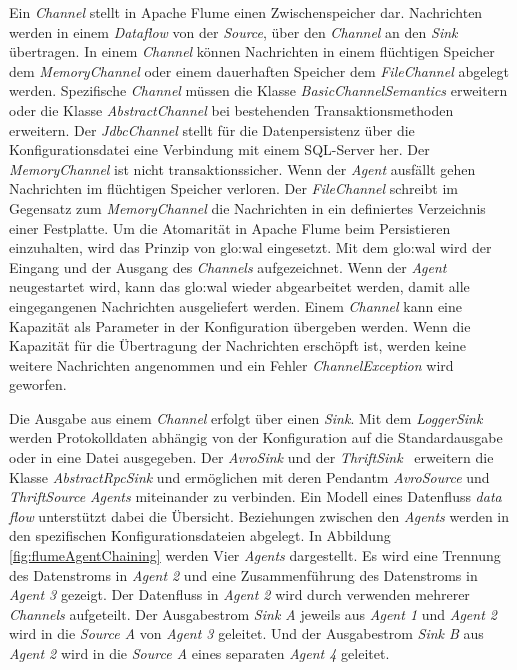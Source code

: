 Ein \textit{Channel} stellt in Apache Flume einen Zwischenspeicher dar. Nachrichten werden in einem \textit{Dataflow} von der \textit{Source}, über den \textit{Channel} an den \textit{Sink} übertragen. In einem \textit{Channel} können Nachrichten in einem flüchtigen Speicher dem \textit{MemoryChannel} oder einem dauerhaften Speicher dem \textit{FileChannel} abgelegt werden. Spezifische \textit{Channel} müssen die Klasse \textit{BasicChannelSemantics}  erweitern oder die Klasse \textit{AbstractChannel} bei bestehenden Transaktionsmethoden erweitern. Der \textit{JdbcChannel} stellt für die Datenpersistenz über die Konfigurationsdatei eine Verbindung mit einem SQL-Server her. Der \textit{MemoryChannel} ist nicht transaktionssicher. Wenn der \textit{Agent} ausfällt gehen Nachrichten im flüchtigen Speicher verloren. Der \textit{FileChannel} schreibt im Gegensatz zum \textit{MemoryChannel} die Nachrichten in ein definiertes Verzeichnis einer Festplatte. Um die Atomarität in Apache Flume beim Persistieren einzuhalten, wird das Prinzip von \gls{glo:wal} eingesetzt. Mit dem \gls{glo:wal} wird der Eingang und der Ausgang des \textit{Channels} aufgezeichnet. Wenn der \textit{Agent} neugestartet wird, kann das \gls{glo:wal} wieder abgearbeitet werden, damit alle eingegangenen Nachrichten ausgeliefert werden. Einem \textit{Channel} kann eine Kapazität als Parameter in der Konfiguration übergeben werden. Wenn die Kapazität für die Übertragung der Nachrichten erschöpft ist, werden keine weitere Nachrichten angenommen und ein Fehler \textit{ChannelException} wird geworfen. 

Die Ausgabe aus einem \textit{Channel} erfolgt über einen \textit{Sink}. Mit dem \textit{LoggerSink} werden Protokolldaten abhängig von der Konfiguration auf die Standardausgabe oder in eine Datei ausgegeben. Der \textit{AvroSink}  und der \textit{ThriftSink}~ erweitern die Klasse \textit{AbstractRpcSink}  und ermöglichen mit deren Pendantm \textit{AvroSource} und \textit{ThriftSource} \textit{Agents} miteinander zu verbinden. Ein Modell eines Datenfluss \textit{data flow} unterstützt dabei die Übersicht. Beziehungen zwischen den \textit{Agents} werden in den spezifischen Konfigurationsdateien abgelegt. In Abbildung \ref{fig:flumeAgentChaining} werden Vier \textit{Agents} dargestellt. Es wird eine Trennung des Datenstroms in \textit{Agent 2} und eine Zusammenführung des Datenstroms in \textit{Agent 3} gezeigt. Der Datenfluss in \textit{Agent 2} wird durch verwenden mehrerer \textit{Channels} aufgeteilt. Der Ausgabestrom \textit{Sink A} jeweils aus \textit{Agent 1} und \textit{Agent 2} wird in die \textit{Source A} von \textit{Agent 3} geleitet. Und der Ausgabestrom \textit{Sink B} aus \textit{Agent 2} wird in die \textit{Source A} eines separaten \textit{Agent 4} geleitet.

